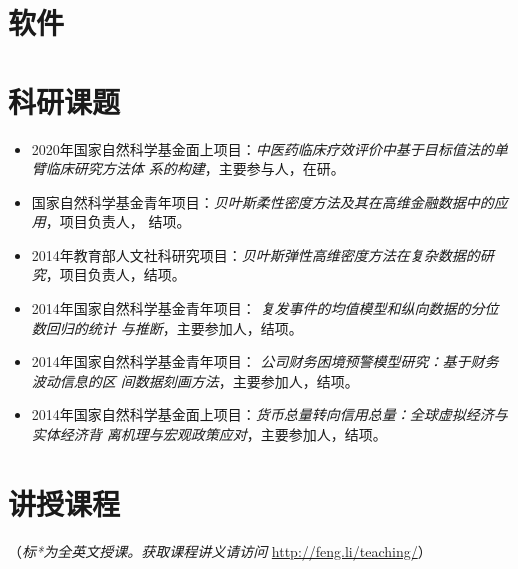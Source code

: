 \documentclass[twoside,a4paper,10pt]{amsart}
\begin{document}
\section*{软件}
\begin{refsection}
\nocite{gratis}
\nocite{spark-dlsa}
\printbibliography[heading=none]
\end{refsection}

\section*{科研课题}

\begin{itemize}

\item 2020年国家自然科学基金面上项目：\emph{中医药临床疗效评价中基于目标值法的单臂临床研究方法体
    系的构建}，主要参与人，在研。

\item 国家自然科学基金青年项目：\emph{贝叶斯柔性密度方法及其在高维金融数据中的应用}，项目负责人，
  结项。

\item 2014年教育部人文社科研究项目：\emph{贝叶斯弹性高维密度方法在复杂数据的研
    究}，项目负责人，结项。

\item 2014年国家自然科学基金青年项目： \emph{复发事件的均值模型和纵向数据的分位数回归的统计
    与推断}，主要参加人，结项。

\item 2014年国家自然科学基金青年项目： \emph{公司财务困境预警模型研究：基于财务波动信息的区
    间数据刻画方法}，主要参加人，结项。

\item 2014年国家自然科学基金面上项目：\emph{货币总量转向信用总量：全球虚拟经济与实体经济背
    离机理与宏观政策应对}，主要参加人，结项。

\end{itemize}

\section*{讲授课程}
（\emph{标*为全英文授课。获取课程讲义请访问} \url{http://feng.li/teaching/}）
\end{document}
